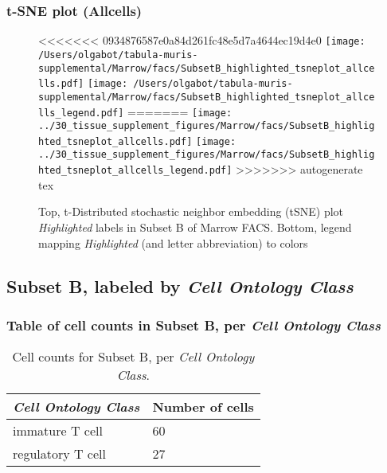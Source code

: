 \subsubsection{t-SNE plot (Allcells)}
\begin{figure}[h]
\centering
<<<<<<< 0934876587e0a84d261fc48e5d7a4644ec19d4e0
\texttt{[image: /Users/olgabot/tabula-muris-supplemental/Marrow/facs/SubsetB\_highlighted\_tsneplot\_allcells.pdf]}
\texttt{[image: /Users/olgabot/tabula-muris-supplemental/Marrow/facs/SubsetB\_highlighted\_tsneplot\_allcells\_legend.pdf]}
=======
\texttt{[image: ../30\_tissue\_supplement\_figures/Marrow/facs/SubsetB\_highlighted\_tsneplot\_allcells.pdf]}
\texttt{[image: ../30\_tissue\_supplement\_figures/Marrow/facs/SubsetB\_highlighted\_tsneplot\_allcells\_legend.pdf]}
>>>>>>> autogenerate tex
\caption{Top, t-Distributed stochastic neighbor embedding (tSNE) plot  \emph{Highlighted} labels in Subset B of Marrow FACS. Bottom, legend mapping \emph{Highlighted} (and letter abbreviation) to colors}
\end{figure}


\clearpage

\subsection{Subset B, labeled by \emph{Cell Ontology Class}}
\subsubsection{Table of cell counts in Subset B, per \emph{Cell Ontology Class}}\begin{table}[h]
\centering
\label{my-label}
\begin{tabular}{@{}ll@{}}
\toprule

\emph{Cell Ontology Class}& Number of cells \\ \midrule
immature T cell & 60 \\

regulatory T cell & 27 \\
\bottomrule
\end{tabular}
\caption{Cell counts for Subset B, per \emph{Cell Ontology Class}.}
\end{table}

\clearpage
